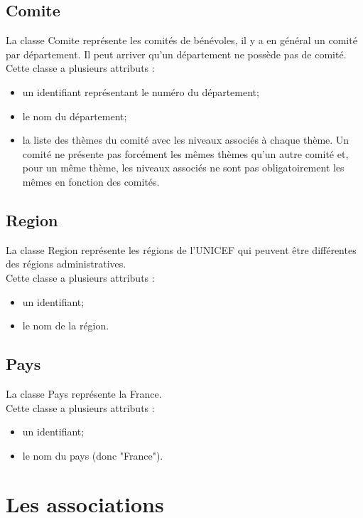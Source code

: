 \documentclass[asi, sansVersion]{picInsa}
\begin{document}
\subsection*{Comite}

La classe Comite représente les comités de bénévoles, il y a en général un comité par département. Il peut arriver qu'un département ne possède pas de comité.\\
Cette classe a plusieurs attributs :
\begin{itemize}
\item un identifiant représentant le numéro du département;
\item le nom du département;
\item la liste des thèmes du comité avec les niveaux associés à chaque thème. Un comité ne présente pas forcément les mêmes thèmes qu'un autre comité et, pour un même thème, les niveaux associés ne sont pas obligatoirement les mêmes en fonction des comités. 
\end{itemize}

\subsection*{Region}

La classe Region représente les régions de l'UNICEF qui peuvent être différentes des régions administratives.\\
Cette classe a plusieurs attributs :
\begin{itemize}
\item un identifiant;
\item le nom de la région.
\end{itemize}

\subsection*{Pays}

La classe Pays représente la France.\\
Cette classe a plusieurs attributs :
\begin{itemize}
\item un identifiant;
\item le nom du pays (donc "France").
\end{itemize}


\section{Les associations}
\end{document}
